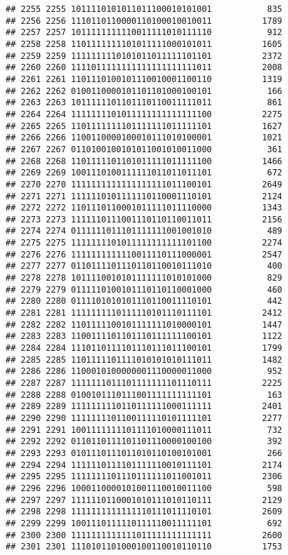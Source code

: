 \documentclass[]{article}
\begin{document}
\begin{verbatim}
## 2255 2255 1011110101011011100010101001           835
## 2256 2256 1110110110000110100010010011          1789
## 2257 2257 1011111111110011111010111110           912
## 2258 2258 1101111111101011111000101011          1605
## 2259 2259 1111111110101011011111101101          2372
## 2260 2260 1111011111111111111111111011          2008
## 2261 2261 1101110100101110010001100110          1319
## 2262 2262 0100110000101101101000100101           166
## 2263 2263 1011111101101110110011111011           861
## 2264 2264 1111111101011111111111111100          2275
## 2265 2265 1101111111101111111011111101          1627
## 2266 2266 1100110000100010111010100001          1021
## 2267 2267 0110100100101011001010011000           361
## 2268 2268 1101111101101011111011111100          1466
## 2269 2269 1001110100111111011011011101           672
## 2270 2270 1111111111111111111011100101          2649
## 2271 2271 1111110101111110110001110101          2124
## 2272 2272 1101110110001011111011110000          1343
## 2273 2273 1111110111001110110110011011          2156
## 2274 2274 0111111011101111111001001010           489
## 2275 2275 1111111101011111111111101100          2274
## 2276 2276 1111111111110011110111000001          2547
## 2277 2277 0110111101110110110010111010           400
## 2278 2278 1011110010101111111010101000           829
## 2279 2279 0111110100101110110110001000           460
## 2280 2280 0111101010101110110011110101           442
## 2281 2281 1111111110111110101110111101          2412
## 2282 2282 1101111100101111111010000101          1447
## 2283 2283 1100111101101110111111100101          1122
## 2284 2284 1110110111101110111011100101          1799
## 2285 2285 1101111101111010101010111011          1482
## 2286 2286 1100010100000001110000011000           952
## 2287 2287 1111111011101111111101110111          2225
## 2288 2288 0100101110111001111111111101           163
## 2289 2289 1111111110110111111000111111          2401
## 2290 2290 1111111101100111110101111101          2277
## 2291 2291 1001111111101111010000111011           732
## 2292 2292 0110110111101101110000100100           392
## 2293 2293 0101110111011010110100101001           266
## 2294 2294 1111110111101111110010111101          2174
## 2295 2295 1111111101110111111011001011          2306
## 2296 2296 1000110000101001110010011100           598
## 2297 2297 1111110110001010111010110111          2129
## 2298 2298 1111111111111110111011110101          2609
## 2299 2299 1001110111110111110011111101           692
## 2300 2300 1111111111111011111111111111          2600
## 2301 2301 1110101101000100110010110110          1753

\end{verbatim}
\end{document}

